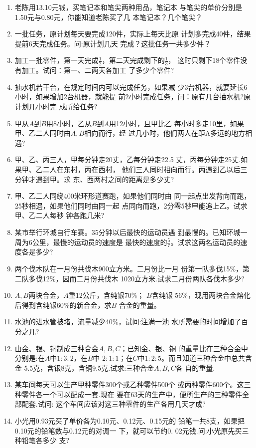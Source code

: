 \begin{enumerate}
\item  老陈用13.10元钱，买笔记本和笔尖两种用品，笔记本
与笔尖的单价分别是1.50元与0.80元，你能知道老陈买了几
本笔记本？几个笔尖？
\item  一批任务，原计划每天要完成120件，实际上每天比原
计划多完成40件，结果提前6天完成任务。问:原计划几天
完成？这批任务一共多少件？
\item  加工一批零件，第一天完成$\frac{1}{2}$，第二天完成剩下的$\frac{1}{3}$，
这时只剩下18个零件没有加工。试问：第一、二两天各加工
了多少个零件?
\item  抽水机若干台，在规定时间内可以完成任务，如果减
少3台机器，就要延长6小时，如果增加2台机器，就能提
前2小时完成任务，问：原有几台抽水机?原计划几小时完
成所给任务?
\item  甲从$A$到$B$用8小时，乙从$B$到$A$用12小时，且甲比乙
每小时多走10里，如果甲、乙二人同时由$A, B$相向而行，经
过几小时，他们两人在距A多远的地方相遇?
\item  甲、乙、丙三人，甲每分钟走20丈，乙每分钟走22.5
丈，丙每分钟走25丈.如果甲、乙二人在东村，丙在西村，
他们三人同时相向而行。丙遇到乙以后三分钟才遇到甲。求
东、西两村之间的距离是多少丈?
\item  甲、乙二人同绕400米环形道赛跑，如果他们同时由
同一起点出发背向而跑，25秒相遇，如果他们同时由同一起
点同向而跑，2分零5秒甲能追上乙。试求甲、乙二人每秒
钟各跑几米?
\item  某市举行环城自行车赛。35分钟以后最快的运动员遇
到最慢的。已知环城一周为6公里，最慢的运动员的速度是
最快的速度的$\frac{5}{7}$。试求这两名运动员的速度各是多少?
\item  两个伐木队在一月份共伐木900立方米。二月份比一月
份第一队多伐15\%，第二队多伐12\%，因而二月份共伐木
1020立方米.试求二月份两队各伐木多少?
\item $A, B$两块合金，$A$重12公斤，含纯银70\%； $B$含纯银
56\%，现用两块合金熔化后得到含纯银60\%的新合金，求$B$
合金的重量。
\item 水池的进水管被堵，流量减少40\%，试间:注满一池
水所需要的时间增加了百分之几?
\item 由金、银、铜制成三种合金$A, B,C$；已知金、银、铜
的重量比在三种合金中分别是:在$A$中$1:3:2$，在$B$中
$2:1:1$；在$C$中$1:2:5$。而且知道三种合金中总共含金
5.5克，含银8克，含铜9.5克.试求:三种合金$A, B,C$各
自的重量.
\item 某车间每天可以生产甲种零件300个或乙种零件500个
或丙种零件600个。这三种零件各一个可以配成一套.现在
要在63天的生产中，便所生产的三种零件全部配套.试问:
这个车间应该对这三种零件的生产各用几天才成?
\item 小光用0.93元买了单价各为0.10元、0.12元、0.15元的
铅笔一共8支，如果把0.10元的铅笔数与0.12元的对调一
下，就可以节约0. 02元钱.问:小光原先买三种铅笔各多少
支?


\end{enumerate}
